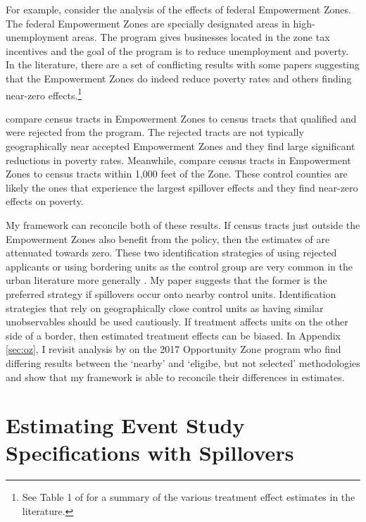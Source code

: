 \documentclass[11pt]{article}
\begin{document}
For example, consider the analysis of the effects of federal Empowerment Zones. The federal Empowerment Zones are specially designated areas in high-unemployment areas. The program gives businesses located in the zone tax incentives and the goal of the program is to reduce unemployment and poverty. In the literature, there are a set of conflicting results with some papers suggesting that the Empowerment Zones do indeed reduce poverty rates and others finding near-zero effects.\footnote{See Table 1 of \citet{Neumark_Young_2019} for a summary of the various treatment effect estimates in the literature.} 

\citet{Busso_Gregory_Kline_2013} compare census tracts in Empowerment Zones to census tracts that qualified and were rejected from the program. The rejected tracts are not typically geographically near accepted Empowerment Zones and they find large significant reductions in poverty rates. Meanwhile, \citet{Neumark_Kolko_2010} compare census tracts in Empowerment Zones to census tracts within 1,000 feet of the Zone. These control counties are likely the ones that experience the largest spillover effects and they find near-zero effects on poverty. 

My framework can reconcile both of these results. If census tracts just outside the Empowerment Zones also benefit from the policy, then the estimates of \citet{Neumark_Kolko_2010} are attenuated towards zero. These two identification strategies of using rejected applicants or using bordering units as the control group are very common in the urban literature more generally \citep{Baum-Snow_Ferreira_2015}. My paper suggests that the former is the preferred strategy if spillovers occur onto nearby control units. Identification strategies that rely on geographically close control units as having similar unobservables should be used cautiously. If treatment affects units on the other side of a border, then estimated treatment effects can be biased. In Appendix \ref{sec:oz}, I revisit analysis by \citet{Chen_Glaeser_Wessel_2021} on the 2017 Opportunity Zone program who find differing results between the `nearby' and `eligibe, but not selected' methodologies and show that my framework is able to reconcile their differences in estimates.

\section{Estimating Event Study Specifications with Spillovers}
\label{sec:event_study}
\end{document}

